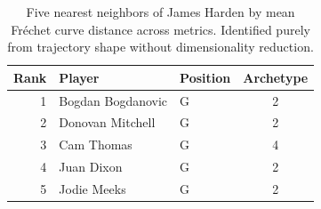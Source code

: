 \begin{table}[htbp]
  \centering\small
  \begin{tabular}{rllc}
    \toprule
    Rank & Player & Position & Archetype \\
    \midrule
    1 & Bogdan Bogdanovic & G & 2 \\
    2 & Donovan Mitchell & G & 2 \\
    3 & Cam Thomas & G & 4 \\
    4 & Juan Dixon & G & 2 \\
    5 & Jodie Meeks & G & 2 \\
    \bottomrule
  \end{tabular}
  \caption{Five nearest neighbors of James Harden by mean Fr\'{e}chet curve distance across metrics. Identified purely from trajectory shape without dimensionality reduction.}
  \label{tab:James_Harden_frechet_curve_neighbors}
\end{table}

